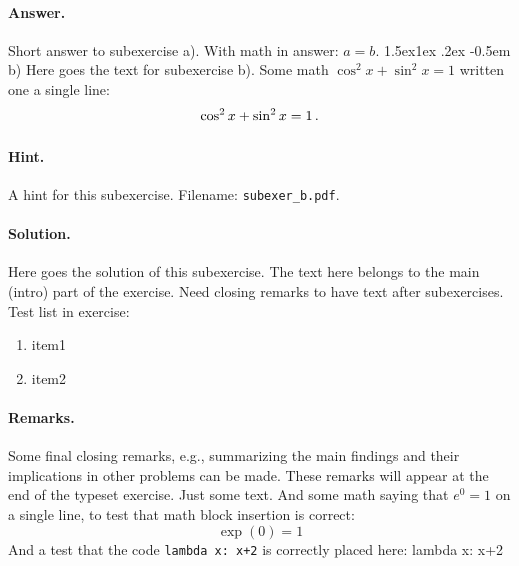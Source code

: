 \documentclass[%
oneside,                 %
final,                   %
10pt]{article}
\makeatletter
\newenvironment{doconceexercise}{}{}
\newcounter{doconceexercisecounter}
\newcommand\subex{\@startsection{paragraph}{4}{\z@}%
                  {1.5ex\@plus1ex \@minus.2ex}%
                  {-0.5em}%
                  {\normalfont\normalsize\bfseries}}
\theoremstyle{definition}
\makeatother
\begin{document}
\begin{enumerate}
\begin{doconceexercise}
\paragraph{Answer.}
Short answer to subexercise a).
With math in answer: $a=b$.
\subex{b)}
Here goes the text for subexercise b).
Some math $\cos^2 x + \sin^2 x = 1$ written one a single line:
\[ \cos^2 x + \sin^2 x = 1 \thinspace .\]
\paragraph{Hint.}
A hint for this subexercise.
\noindent Filename: \Verb!subexer_b.pdf!.
\paragraph{Solution.}
Here goes the solution of this subexercise.
The text here belongs to the main (intro) part of the exercise. Need
closing remarks to have text after subexercises.
Test list in exercise:
\begin{enumerate}
\item item1
\item item2
\end{enumerate}
\noindent
\paragraph{Remarks.}
Some final closing remarks, e.g., summarizing the main findings
and their implications in other problems can be made. These
remarks will appear at the end of the typeset exercise.
\end{doconceexercise}
\begin{doconceexercise}
Just some text. And some math saying that $e^0=1$ on a single line,
to test that math block insertion is correct:
\[ \exp{(0)} = 1 \]
And a test that the code \texttt{lambda x: x+2} is correctly placed here:
\bccq
lambda x: x+2

\eccq

\end{doconceexercise}
\begin{doconceexercise}
                             

\end{doconceexercise}
\end{enumerate}
\end{document}
